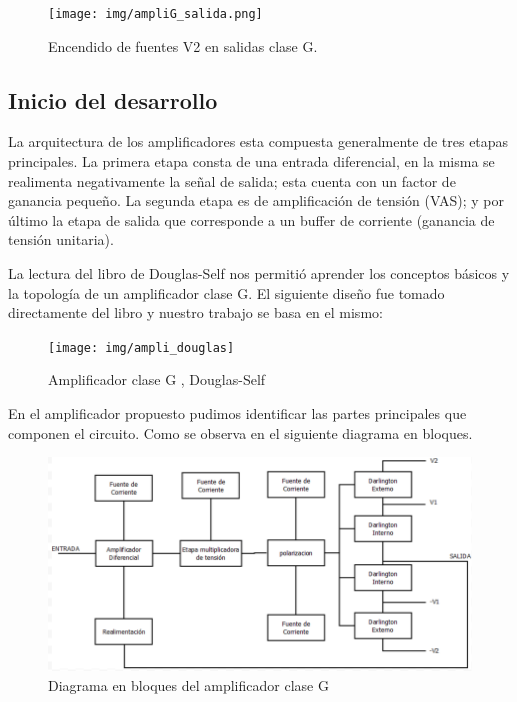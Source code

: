 \documentclass[a4paper,12pt,twoside]{article}
\begin{document}
\begin{figure}[H]
 \centering
 \texttt{[image: img/ampliG\_salida.png]}
 \caption{Encendido de fuentes V2 en salidas clase G.}
 \label{ampliG_salida} 
 \end{figure}

\subsection{Inicio del desarrollo}

La arquitectura de los amplificadores esta compuesta generalmente de tres etapas principales. La primera etapa consta de una entrada diferencial, en la misma se realimenta negativamente la señal de salida; esta cuenta con un factor de ganancia pequeño. La segunda etapa es de amplificación de tensión (VAS); y por último la etapa de salida que corresponde a un buffer de corriente (ganancia de tensión unitaria).

La lectura del libro de Douglas-Self nos permitió aprender los conceptos básicos y la topología de un amplificador clase G. El siguiente diseño fue tomado directamente del libro y nuestro trabajo se basa en el mismo:

\begin{figure}[H]
	\centering
	\texttt{[image: img/ampli\_douglas]}
	\caption{Amplificador clase G , Douglas-Self}
	\label{douglas}
\end{figure}

\newpage
En el amplificador propuesto pudimos identificar las partes principales que componen el circuito. Como se observa en el siguiente diagrama en bloques.

\begin{figure}[H]
	\centering
	\includegraphics[scale=0.75]{img/ampli_bloques}
	\caption{Diagrama en bloques del amplificador clase G}
	\label{fig.1}
\end{figure}
\end{document}
